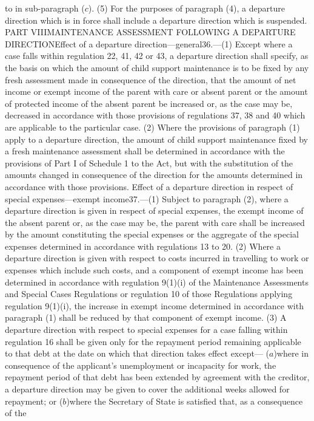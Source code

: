 \documentclass[a4paper]{article}
\begin{document}
to in sub-paragraph ($c$).
(5) For the purposes of paragraph (4), a departure direction which is in force
shall include a departure direction which is suspended.
PART VIIIMAINTENANCE ASSESSMENT FOLLOWING A DEPARTURE DIRECTIONEffect of a
departure direction—general36.—(1) Except where a case falls within regulation
22, 41, 42 or 43, a departure direction shall specify, as the basis on which the
amount of child support maintenance is to be fixed by any fresh assessment made
in consequence of the direction, that the amount of net income or exempt income
of the parent with care or absent parent or the amount of protected income of
the absent parent be increased or, as the case may be, decreased in accordance
with those provisions of regulations 37, 38 and 40 which are applicable to the
particular case.
(2) Where the provisions of paragraph (1) apply to a departure direction, the
amount of child support maintenance fixed by a fresh maintenance assessment
shall be determined in accordance with the provisions of Part I of Schedule 1 to
the Act, but with the substitution of the amounts changed in consequence of the
direction for the amounts determined in accordance with those provisions.
Effect of a departure direction in respect of special expenses—exempt
income37.—(1) Subject to paragraph (2), where a departure direction is given in
respect of special expenses, the exempt income of the absent parent or, as the
case may be, the parent with care shall be increased by the amount constituting
the special expenses or the aggregate of the special expenses determined in
accordance with regulations 13 to 20.
(2) Where a departure direction is given with respect to costs incurred in
travelling to work or expenses which include such costs, and a component of
exempt income has been determined in accordance with regulation 9(1)(i) of the
Maintenance Assessments and Special Cases Regulations or regulation 10 of those
Regulations applying regulation 9(1)(i), the increase in exempt income
determined in accordance with paragraph (1) shall be reduced by that component
of exempt income.
(3) A departure direction with respect to special expenses for a case falling
within regulation 16 shall be given only for the repayment period remaining
applicable to that debt at the date on which that direction takes effect except—
($a$)where in consequence of the applicant’s unemployment or incapacity for work,
the repayment period of that debt has been extended by agreement with the
creditor, a departure direction may be given to cover the additional weeks
allowed for repayment; or
($b$)where the Secretary of State is satisfied that, as a consequence of the
\end{document}
